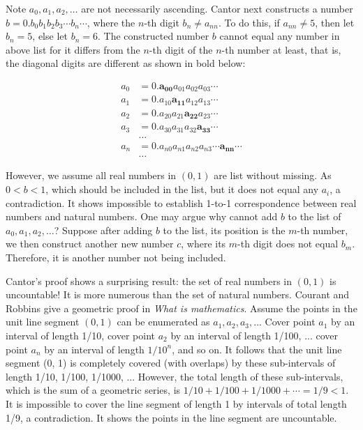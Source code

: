 \documentclass[b5paper]{article}
\begin{document}
Note $a_0, a_1, a_2, \dotsc$ are not necessarily ascending. Cantor next constructs a number $b = 0.b_0b_1b_2b_3 \dotsm b_n \dotsm$, where the $n$-th digit $b_n \neq a_{nn}$. To do this, if $a_{nn} \neq 5$, then let $b_n = 5$, else let $b_n = 6$. The constructed number $b$ cannot equal any number in above list for it differs from the $n$-th digit of the $n$-th number at least, that is, the diagonal digits are different as shown in bold below:

\begin{align*}
a_0 &= 0.\pmb{a_{00}}a_{01}a_{02}a_{03}\dotsm \\
a_1 &= 0.a_{10}\pmb{a_{11}}a_{12}a_{13}\dotsm \\
a_2 &= 0.a_{20}a_{21}\pmb{a_{22}}a_{23}\dotsm \\
a_3 &= 0.a_{30}a_{31}a_{32}\pmb{a_{33}}\dotsm \\
    &\dotso \\
a_n &= 0.a_{n0}a_{n1}a_{n2}a_{n3} \dotsm \pmb{a_{nn}}\dotsm \\
    &\dotso
\end{align*}

However, we assume all real numbers in $(0, 1)$ are list without missing. As $0 < b < 1$, which should be included in the list, but it does not equal any $a_i$, a contradiction. It shows impossible to establish 1-to-1 correspondence between real numbers and natural numbers. One may argue why cannot add $b$ to the list of $a_0, a_1, a_2, \dotsc$? Suppose after adding $b$ to the list, its position is the $m$-th number, we then construct another new number $c$, where its $m$-th digit does not equal $b_m$. Therefore, it is another number not being included.

Cantor's proof shows a surprising result: the set of real numbers in $(0, 1)$ is uncountable! It is more numerous than the set of natural numbers. Courant and Robbins give a geometric proof in \emph{What is mathematics}. Assume the points in the unit line segment $(0, 1)$ can be enumerated as $a_1, a_2, a_3, ...$ Cover point $a_1$ by an interval of length 1/10, cover point $a_2$ by an interval of length 1/100, ... cover point $a_n$ by an interval of length $1/10^n$, and so on. It follows that the unit line segment (0, 1) is completely covered (with overlaps) by these sub-intervals of length 1/10, 1/100, 1/1000, ... However, the total length of these sub-intervals, which is the sum of a geometric series, is $1/10 + 1/100 + 1/1000 + \dotsb = 1/9 < 1$. It is impossible to cover the line segment of length 1 by intervals of total length 1/9, a contradiction. It shows the points in the line segment are uncountable\cite{Courant1969}.
\end{document}
